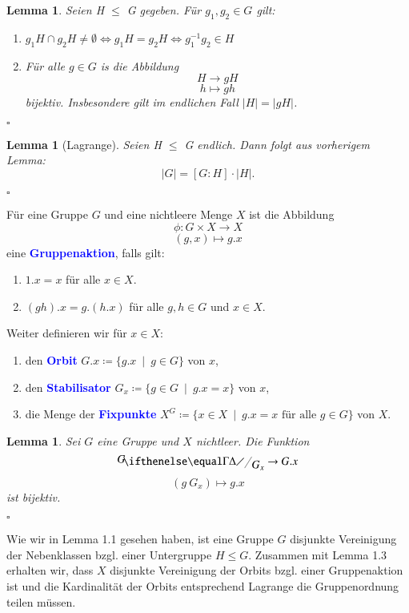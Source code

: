 \documentclass[a4paper,12pt]{scrartcl}
\newtheorem{Lemma}[Theorem]{Lemma}
\newcommand{\st}{\ \mid\ }
\newcommand{\df}[1]{\textcolor{blue}{\textbf{#1}}}
\begin{document}
	\begin{Lemma}
		Seien H $\leq$ G gegeben. Für $g_{1}, g_{2}\in G$ gilt:
		\begin{enumerate}
			\item $g_{1}H \cap g_{2}H \neq \emptyset \iff g_{1}H = g_{2}H \iff g_{1}^{-1}g_{2}\in H$
			\item Für alle $g\in G$ is die Abbildung $$H \to gH$$ $$h \mapsto gh$$ bijektiv. Insbesondere gilt im endlichen Fall $|H|=|gH|$.
		\end{enumerate}
	\begin{flushright}
		$\square$
	\end{flushright}
	\end{Lemma}
	
	\begin{Lemma}[Lagrange]
		Seien H $\leq$ G endlich. Dann folgt aus vorherigem Lemma:
		$$|G|=[G : H] \cdot |H|.$$
	\begin{flushright}
		$\square$
	\end{flushright}
	\end{Lemma}
	
	Für eine Gruppe $G$ und eine nichtleere Menge $X$ ist die Abbildung
	$$\phi:G\times X \to X$$
	$$(g,x) \mapsto g.x$$
	eine \df{Gruppenaktion}, falls gilt:
	\begin{enumerate}
		\item $1.x=x$ für alle $x\in X$.
		\item $(gh).x=g.(h.x)$ für alle $g,h\in G$ und $x\in X$.
	\end{enumerate}
	Weiter definieren wir für $x\in X$:
	\begin{enumerate}
		\item den \df{Orbit} $G.x\coloneqq \{g.x\st g\in G\}$ von $x$,
		\item den \df{Stabilisator} $G_{x}\coloneqq \{g\in G\st g.x=x\}$ von $x$,
		\item die Menge der \df{Fixpunkte} $X^{G}\coloneqq\{x\in X\st g.x=x\text{ für alle }g\in G\}$ von $X$.
	\end{enumerate}
	
	\begin{Lemma}
		Sei $G$ eine Gruppe und $X$ nichtleer. Die Funktion
		$$\fkr{G}{G_{x}} \to G.x$$
		$$(g\ G_{x})\mapsto g.x$$
		ist bijektiv.
	\begin{flushright}
		$\square$
	\end{flushright}
	\end{Lemma}
	
	Wie wir in Lemma 1.1 gesehen haben, ist eine Gruppe $G$ disjunkte Vereinigung der Nebenklassen bzgl. einer Untergruppe $H\leq G$. Zusammen mit Lemma 1.3 erhalten wir, dass $X$ disjunkte Vereinigung der Orbits bzgl. einer Gruppenaktion ist und die Kardinalität der Orbits entsprechend Lagrange die Gruppenordnung teilen müssen.
	
\end{document}
